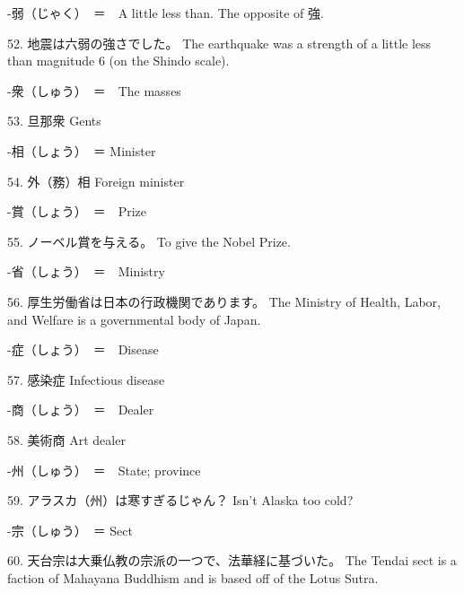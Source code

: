 \par{-弱（じゃく）　＝　A little less than. The opposite of 強. }

\par{52. 地震は六弱の強さでした。 \hfill\break
The earthquake was a strength of a little less than magnitude 6 (on the Shindo scale). }

\par{-衆（しゅう）　＝　The masses }

\par{53. 旦那衆 \hfill\break
Gents }

\par{-相（しょう）　＝ Minister }

\par{54. 外（務）相 \hfill\break
Foreign minister }

\par{-賞（しょう）　＝　Prize }

\par{55. ノーベル賞を与える。 \hfill\break
To give the Nobel Prize. }

\par{-省（しょう）　＝　Ministry }

\par{56. 厚生労働省は日本の行政機関であります。 \hfill\break
The Ministry of Health, Labor, and Welfare is a governmental body of Japan. }

\par{-症（しょう）　＝　Disease }

\par{57. 感染症 \hfill\break
Infectious disease }

\par{-商（しょう）　＝　Dealer }

\par{58. 美術商 \hfill\break
Art dealer }

\par{-州（しゅう）　＝　State; province }

\par{59. アラスカ（州）は寒すぎるじゃん？ \hfill\break
Isn't Alaska too cold? }

\par{-宗（しゅう）　＝ Sect }

\par{60. 天台宗は大乗仏教の宗派の一つで、法華経に基づいた。 \hfill\break
The Tendai sect is a faction of Mahayana Buddhism and is based off of the Lotus Sutra. }
    